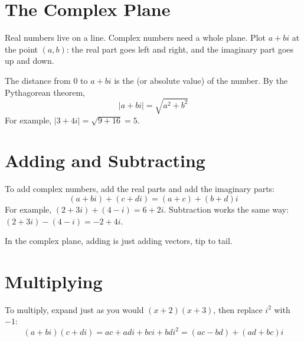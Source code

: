 \section{The Complex Plane}
Real numbers live on a line. Complex numbers need a whole plane. Plot
$a + bi$ at the point $(a, b)$: the real part goes left and right, and the
imaginary part goes up and down.

\begin{center}
\end{center}

The distance from $0$ to $a + bi$ is the  (or absolute
value) of the number. By the Pythagorean theorem,
$$|a + bi| = \sqrt{a^2 + b^2}$$
For example, $|3 + 4i| = \sqrt{9 + 16} = 5$.

\section{Adding and Subtracting}

To add complex numbers, add the real parts
and add the imaginary parts:
\begin{equation}
(a + bi) + (c + di) = (a + c) + (b + d)i
\end{equation}
For example, $(2 + 3i) + (4 - i) = 6 + 2i$. Subtraction works the same way:
$(2 + 3i) - (4 - i) = -2 + 4i$.

In the complex plane, adding is just adding vectors, tip to tail.

\section{Multiplying}

To multiply, expand just as you would
$(x + 2)(x + 3)$, then replace $i^2$ with $-1$:
\begin{equation}
(a + bi)(c + di) = ac + adi + bci + bdi^2 = (ac - bd) + (ad + bc)i
\end{equation}

